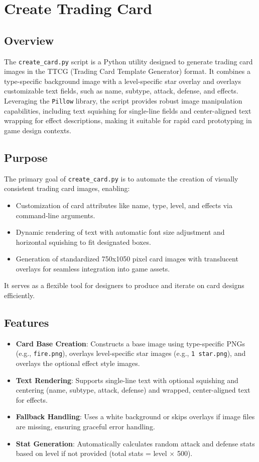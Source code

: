 \section{Create Trading Card}
\subsection{Overview}
The \texttt{create\_card.py} script is a Python utility designed to generate trading card images in the TTCG (Trading Card Template Generator) format. It combines a type-specific background image with a level-specific star overlay and overlays customizable text fields, such as name, subtype, attack, defense, and effects. Leveraging the \texttt{Pillow} library, the script provides robust image manipulation capabilities, including text squishing for single-line fields and center-aligned text wrapping for effect descriptions, making it suitable for rapid card prototyping in game design contexts.

\subsection{Purpose}
The primary goal of \texttt{create\_card.py} is to automate the creation of visually consistent trading card images, enabling:
\begin{itemize}
	\item Customization of card attributes like name, type, level, and effects via command-line arguments.
	\item Dynamic rendering of text with automatic font size adjustment and horizontal squishing to fit designated boxes.
	\item Generation of standardized 750x1050 pixel card images with translucent overlays for seamless integration into game assets.
\end{itemize}
It serves as a flexible tool for designers to produce and iterate on card designs efficiently.

\subsection{Features}
\begin{itemize}
	\item \textbf{Card Base Creation}: Constructs a base image using type-specific PNGs (e.g., \texttt{fire.png}), overlays level-specific star images (e.g., \texttt{1 star.png}), and overlays the optional effect style images.
	\item \textbf{Text Rendering}: Supports single-line text with optional squishing and centering (name, subtype, attack, defense) and wrapped, center-aligned text for effects.
	\item \textbf{Fallback Handling}: Uses a white background or skips overlays if image files are missing, ensuring graceful error handling.
	\item \textbf{Stat Generation}: Automatically calculates random attack and defense stats based on level if not provided (total stats = level $\times$ 500).
\end{itemize}


